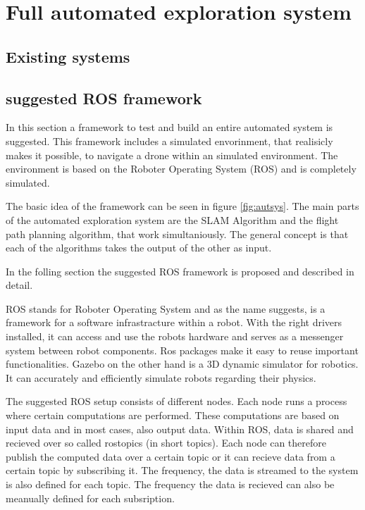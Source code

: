 \chapter{Full automated exploration system}

\section{Existing systems}

	
\section{suggested ROS framework}
	
	In this section a framework to test and build an entire automated system is suggested. This framework includes a 
	simulated envorinment, that realisicly makes it possible, to navigate a drone within an simulated environment. The environment 
	is based on the Roboter Operating System (ROS) and is completely simulated. 
	
	The basic idea of the framework can be seen in figure \ref{fig:autsys}. The main parts of the automated exploration system are the SLAM Algorithm
	and the flight path planning algorithm, that work simultaniously. The general concept is that each of the algorithms takes the output of the other as 
	input. 
	
	In the folling section the suggested ROS framework is proposed and described in detail. 
	
		
	ROS stands for Roboter Operating System and as the name suggests, is a framework for a software infrastracture within a robot. With the right drivers installed, 
	it can access and use the robots hardware and serves as a messenger system between robot components. Ros packages make it easy to 
	reuse important functionalities. Gazebo on the other hand is a 3D dynamic simulator for robotics. It can accurately and efficiently simulate robots regarding
	their physics. 
	
	The suggested ROS setup consists of different nodes. Each node runs a process where certain computations are performed. These computations are based on input data
	and in most cases, also output data. Within ROS, data is shared and recieved over so called rostopics (in short topics). Each node can therefore publish the computed 
	data over a certain topic or it can recieve data from a certain topic by subscribing it. The frequency, the data is streamed to the system is also defined for each 
	topic. The frequency the data is recieved can also be meanually defined for each subsription. 
	

